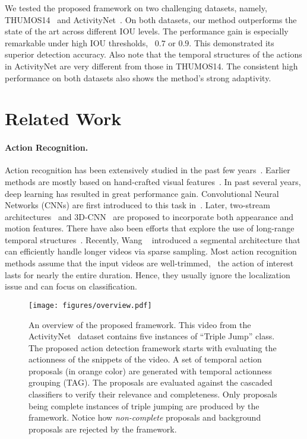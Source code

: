 \documentclass[10pt,twocolumn,letterpaper]{article}
\begin{document}
We tested the proposed framework on two challenging datasets, namely,
THUMOS14~\cite{Jiang2014THUMOS14} and ActivityNet~\cite{caba2015activitynet}.
On both datasets, our method outperforms the state of the art across different IOU levels. 
The performance gain is especially remarkable under high IOU thresholds, \eg~$0.7$ or $0.9$.
This demonstrated its superior detection accuracy.
Also note that the temporal structures of the actions in ActivityNet are very 
different from those in THUMOS14. 
The consistent high performance on both datasets also shows the method's strong adaptivity.


 
\section{Related Work}
\label{related}


\paragraph{Action Recognition.}
Action recognition has been extensively studied in the past few years~\cite{Laptev05STIP,WangS13IDT,Simonyan14TwoStream,Tran15C3D,WangQT15TDD,Wang2016TSN,ZhangWW0W16}.
Earlier methods are mostly based on hand-crafted visual features~\cite{Laptev05STIP,WangS13IDT}.
In past several years, deep learning has resulted in great performance gain.
Convolutional Neural Networks (CNNs) are first introduced to this task in~\cite{KarpathyCVPR14Sports1M}.
Later, two-stream architectures~\cite{Simonyan14TwoStream} and 3D-CNN~\cite{Tran15C3D} 
are proposed to incorporate both appearance and motion features.
There have also been efforts that explore the use of long-range temporal structures~\cite{WangQT15TDD,Ng15BeyondSnippet,DonahueJ2015LRCN}.
Recently, Wang \etal~\cite{Wang2016TSN} introduced a segmental architecture
that can efficiently handle longer videos via sparse sampling.
Most action recognition methods assume that the input videos are well-trimmed,
\ie~the action of interest lasts for nearly the entire duration. 
Hence, they usually ignore the localization issue and can focus on classification.


\begin{figure*}[t]
	\centering
	\texttt{[image: figures/overview.pdf]}
	\caption{An overview of the proposed framework. This video from the ActivityNet~\cite{caba2015activitynet} dataset contains five instances of ``Triple Jump'' class. The proposed action detection framework starts with evaluating the actionness of the snippets of the video. 
		A set of temporal action proposals (in orange color) are generated with temporal actionness grouping (TAG). The proposals are evaluated against the cascaded classifiers to verify their relevance and completeness. Only proposals being complete instances of triple jumping are produced by the framework. Notice how \emph{non-complete} proposals and background proposals are rejected by the framework.}
	\label{fig:overview}
\end{figure*}
\end{document}
